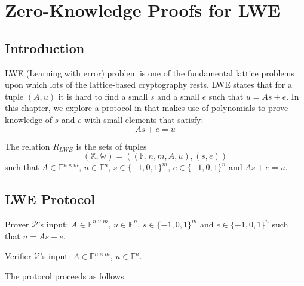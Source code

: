 \chapter{Zero-Knowledge Proofs for LWE}

\section{Introduction}

LWE (Learning with error) problem is one of the fundamental lattice problems upon which lots of the lattice-based cryptography rests. LWE states that for a tuple $(A, u)$ it is hard to find a small $s$ and a small $e$ such that $u = As+e$. In this chapter, we explore a protocol in \cite{lwe} that makes use of polynomials to prove knowledge of $s$ and $e$ with small elements that satisfy:
$$
    As + e = u
$$

\begin{definition}
The relation $R_{LWE}$ is the sets of tuples
$$
    (\mathbb{X}, \mathbb{W}) = ((\mathbb{F}, n, m, A, u), (s, e))
$$ 
such that $A \in \mathbb{F}^{n \times m}$, $u \in \mathbb{F}^{n}$, $s \in \{-1, 0, 1\}^{m}$, $e \in \{-1, 0, 1\}^{n}$ and $As + e = u$.
\end{definition}


\section{LWE Protocol}


Prover $\mathcal{P}$'s input: $A \in \mathbb{F}^{n \times m}$, $u \in \mathbb{F}^{n}$, $s \in \{-1, 0, 1\}^{m}$ and $e \in \{-1, 0, 1\}^{n}$ such that $u = As + e$.

Verifier $\mathcal{V}$'s input: $A \in \mathbb{F}^{n \times m}$, $u \in \mathbb{F}^{n}$.

The protocol proceeds as follows.



